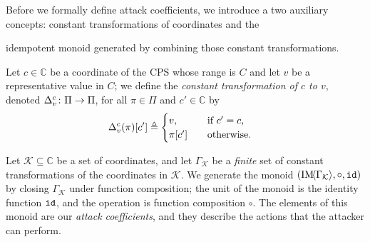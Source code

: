 {Before we formally define attack coefficients, we introduce a two auxiliary concepts: {constant transformations of coordinates} and the {idempotent monoid generated by combining those constant transformations.
\begin{definition}
  Let $c\in \mathbb{C}$ be a coordinate of the CPS whose range is $C$ and let $v$ be a representative value in $C$; we define the \emph{constant transformation of $c$ to $v$}, denoted ${\Delta}^{c}_{v}\colon \Pi\rightarrow \Pi$, for all $\pi \in \Pi$ and $c'\in \mathbb{C}$ by
  \begin{align}
    {\Delta}^{c}_{v}(\pi)[c']& \triangleq 
    \begin{cases}
     v, &\quad \text{if $c'=c$,}\\
     \pi[c']&\quad \text{otherwise.}
    \end{cases} 
  \end{align} 
\end{definition}

\begin{definition}
  \label{def:CPSRobustness:IdempotentMonoid}

Let $\mathcal{K}\subseteq\mathbb{C}$ be a set of coordinates, and let $\Gamma_\mathcal{K}$ be a \emph{finite} set of constant transformations of the coordinates in $\mathcal{K}$. We generate the monoid $(\text{IM}\!{{\left<\Gamma_{\mathcal{K}}\right>}},\circ,{\texttt{id}})$ %
by closing %
$\Gamma_{\mathcal{K}}$ under function composition; the unit of the monoid is the identity function ${\texttt{id}}$, and the operation is function composition $\circ$. The elements of this monoid are our \emph{attack coefficients}, and they describe the actions that the attacker can perform.


\end{definition}}}

